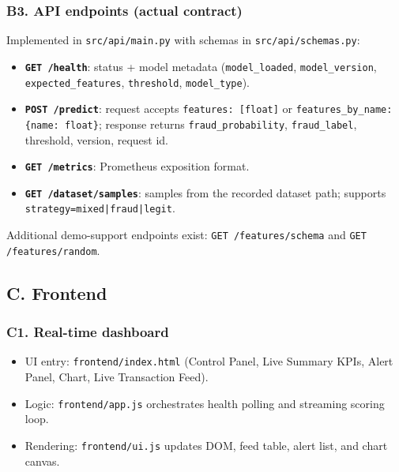 \documentclass[11pt]{article}
\newcommand{\code}[1]{\texttt{#1}}
\begin{document}
\subsubsection*{B3. API endpoints (actual contract)}
Implemented in \code{src/api/main.py} with schemas in \code{src/api/schemas.py}:
\begin{itemize}
  \item \textbf{\code{GET /health}}: status + model metadata (\code{model\_loaded}, \code{model\_version}, \code{expected\_features}, \code{threshold}, \code{model\_type}).
  \item \textbf{\code{POST /predict}}: request accepts \code{features: [float]} or \code{features\_by\_name: \{name: float\}}; response returns \code{fraud\_probability}, \code{fraud\_label}, threshold, version, request id.
  \item \textbf{\code{GET /metrics}}: Prometheus exposition format.
  \item \textbf{\code{GET /dataset/samples}}: samples from the recorded dataset path; supports \code{strategy=mixed|fraud|legit}.
\end{itemize}
Additional demo-support endpoints exist: \code{GET /features/schema} and \code{GET /features/random}.

\subsection*{C. Frontend}

\subsubsection*{C1. Real-time dashboard}
\begin{itemize}
  \item UI entry: \code{frontend/index.html} (Control Panel, Live Summary KPIs, Alert Panel, Chart, Live Transaction Feed).
  \item Logic: \code{frontend/app.js} orchestrates health polling and streaming scoring loop.
  \item Rendering: \code{frontend/ui.js} updates DOM, feed table, alert list, and chart canvas.
\end{itemize}
\end{document}
